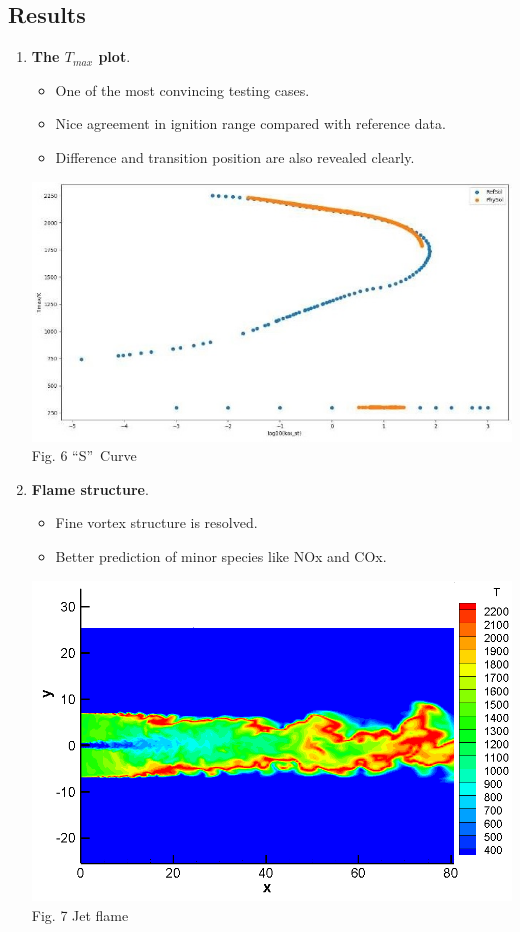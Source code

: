 \documentclass[a0,portrait]{a0poster}
\begin{document}
\begin{multicols}{2}
\section*{Results}
	\color{DarkSlateGray}
	\begin{enumerate}[(1)]
		\item 
			\textbf{The $T_{max}$ plot}.
			\begin{itemize}
				\item 
					One of the most convincing testing cases.
				\item 
					Nice agreement in ignition range compared with reference data.
				\item 
					Difference and transition position are also revealed clearly.	
			\end{itemize}
			\begin{center}
				\includegraphics[width=\linewidth]{pic/Tmax.jpg}\\
				{\color{Green} Fig. 6 ``S''\ Curve}
			\end{center}
		\item 
			\textbf{Flame structure}.
			\begin{itemize}
				\item 
					Fine vortex structure is resolved.
				\item 
					Better prediction of minor species like NOx and COx.
			\end{itemize}
			\begin{center}
				\includegraphics[width=\linewidth]{pic/flame.png}\\
				{\color{Green} Fig. 7 Jet flame}
			\end{center}
	\end{enumerate}


\end{multicols}
\end{document}
